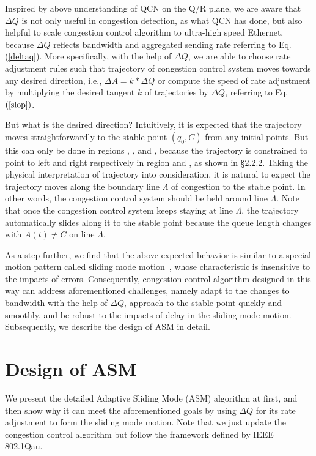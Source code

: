 \documentclass{sig-alternate-10pt}
\begin{document}
Inspired by above understanding of QCN on the Q/R plane, we are aware that $\Delta Q$ is not only useful in congestion detection, as what QCN has done, but also helpful to scale congestion control algorithm to ultra-high speed Ethernet, because $\Delta Q$ reflects bandwidth and  aggregated sending rate referring to Eq. (\ref{deltaq}). More specifically, with the help of $\Delta Q$, we are able to choose rate adjustment rules such that trajectory of congestion control system moves towards any desired direction, i.e., $\Delta A=k*\Delta Q$ or compute the speed of rate adjustment by multiplying the desired tangent $k$ of trajectories by $\Delta Q$, referring to Eq. $(\ref{slop})$.


But what is the desired direction? Intuitively, it is expected that the trajectory moves straightforwardly to the stable point $(q_0, C)$ from any initial points. But this can only be done in regions , ,  and , because the trajectory is constrained to point to left and right respectively in region  and , as shown in \S2.2.2. Taking the physical interpretation of trajectory into consideration, it is natural to expect the trajectory moves along the boundary line $\Lambda$ of congestion  to the stable point. In other words, the congestion control system should be held around line $\Lambda$. Note that once the congestion control system keeps staying at line $\Lambda$, the trajectory automatically slides along it to the stable point because the queue length changes with $A(t)\neq C$ on line $\Lambda$.


As a step further, we find that the above expected behavior is similar to a special motion pattern called sliding mode motion~\cite{Itkis}, whose characteristic is insensitive to the impacts of errors. Consequently, congestion control algorithm designed in this way can address aforementioned challenges, namely adapt to the changes to bandwidth with the help of $\Delta Q$, approach to the stable point quickly and smoothly, and be robust to the impacts of delay in the sliding mode motion. Subsequently, we describe the design of ASM in detail. 


\section{Design of ASM}
We present the detailed Adaptive Sliding Mode (ASM) algorithm at first, and then show why it can meet the aforementioned goals by using $\Delta Q$ for its rate adjustment to form the sliding mode motion. Note that we just update the congestion control algorithm but follow the framework defined by IEEE 802.1Qau. 
\end{document}
